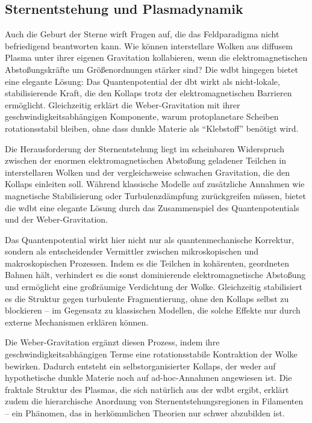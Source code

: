 \subsection{Sternentstehung und Plasmadynamik}
Auch die Geburt der Sterne wirft Fragen auf, die das Feldparadigma nicht befriedigend beantworten kann. Wie können interstellare Wolken aus diffusem Plasma unter ihrer eigenen
Gravitation kollabieren, wenn die elektromagnetischen Abstoßungskräfte um Größenordnungen stärker sind? Die \gls{wdbt} hingegen bietet eine elegante Lösung: Das Quantenpotential der \gls{dbt} wirkt als nicht-lokale,
stabilisierende Kraft, die den Kollaps trotz der elektromagnetischen Barrieren ermöglicht. Gleichzeitig erklärt die Weber-Gravitation mit ihrer geschwindigkeitsabhängigen Komponente,
warum protoplanetare Scheiben rotationsstabil bleiben, ohne dass dunkle Materie als \enquote{Klebstoff} benötigt wird.

Die Herausforderung der Sternentstehung liegt im scheinbaren Widerspruch zwischen der enormen elektromagnetischen Abstoßung geladener Teilchen in interstellaren Wolken und der
vergleichsweise schwachen Gravitation, die den Kollaps einleiten soll. Während klassische Modelle auf zusätzliche Annahmen wie magnetische Stabilisierung oder Turbulenzdämpfung
zurückgreifen müssen, bietet die \gls{wdbt} eine elegante Lösung durch das Zusammenspiel des Quantenpotentials und der Weber-Gravitation.

Das Quantenpotential wirkt hier nicht nur als quantenmechanische Korrektur, sondern als entscheidender Vermittler zwischen mikroskopischen und makroskopischen Prozessen. Indem es
die Teilchen in kohärenten, geordneten Bahnen hält, verhindert es die sonst dominierende elektromagnetische Abstoßung und ermöglicht eine großräumige Verdichtung der Wolke.
Gleichzeitig stabilisiert es die Struktur gegen turbulente Fragmentierung, ohne den Kollaps selbst zu blockieren – im Gegensatz zu klassischen Modellen, die solche Effekte nur
durch externe Mechanismen erklären können.

Die Weber-Gravitation ergänzt diesen Prozess, indem ihre geschwindigkeitsabhängigen Terme eine rotationsstabile Kontraktion der Wolke bewirken. Dadurch entsteht ein
selbstorganisierter Kollaps, der weder auf hypothetische dunkle Materie noch auf ad-hoc-Annahmen angewiesen ist. Die fraktale Struktur des Plasmas, die sich natürlich aus der
\gls{wdbt} ergibt, erklärt zudem die hierarchische Anordnung von Sternentstehungsregionen in Filamenten – ein Phänomen, das in herkömmlichen Theorien nur schwer abzubilden ist.

